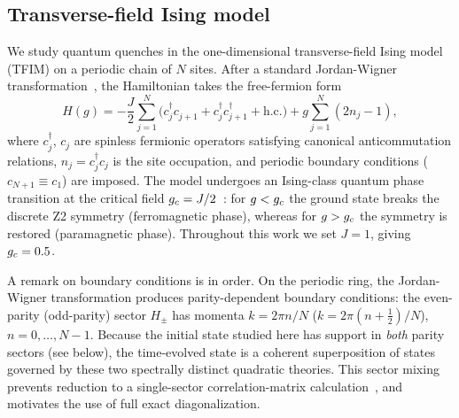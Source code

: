 
\subsection{Transverse-field Ising model}
\label{sec:TFIM}

We study quantum quenches in the one-dimensional transverse-field Ising model (TFIM) on a
periodic chain of $N$ sites.
After a standard Jordan-Wigner transformation~\cite{Lieb1961}, the Hamiltonian takes the
free-fermion form
\begin{equation}
  H(g) = -\frac{J}{2}\sum_{j=1}^{N}\!\bigl(c_j^\dagger c_{j+1}^{\phantom{\dagger}}
  + c_j^\dagger c_{j+1}^\dagger + \mathrm{h.c.}\bigr)
  + g\sum_{j=1}^{N}(2n_j - 1),
  \label{eq:TFIM}
\end{equation}
where $c_j^\dagger$, $c_j$ are spinless fermionic operators satisfying canonical
anticommutation relations, $n_j = c_j^\dagger c_j$ is the site occupation, and
periodic boundary conditions ($c_{N+1} \equiv c_1$) are imposed.
The model undergoes an Ising-class quantum phase transition at the critical field
$g_c = J/2$~\cite{Sachdev2011}: for $g < g_c$ the ground state breaks the discrete Z2
symmetry (ferromagnetic phase), whereas for $g > g_c$ the symmetry is restored (paramagnetic
phase). Throughout this work we set $J = 1$, giving $g_c = 0.5$.

A remark on boundary conditions is in order.
On the periodic ring, the Jordan-Wigner transformation produces parity-dependent boundary
conditions: the even-parity (odd-parity) sector $H_\pm$ has
momenta $k = 2\pi n/N$ ($k = 2\pi(n+\tfrac{1}{2})/N$), $n = 0,\ldots, N-1$.
Because the initial state studied here has support in \emph{both} parity sectors
(see below), the time-evolved state is a coherent superposition of states governed by
these two spectrally distinct quadratic theories.
This sector mixing prevents reduction to a single-sector correlation-matrix
calculation~\cite{Fagotti2008}, and motivates the use of full exact diagonalization.

